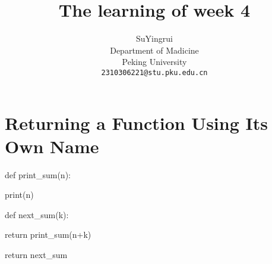 \documentclass{article}
\title{The learning of week 4}
\author{%
  SuYingrui \\
  Department of Madicine\\
  Peking University\\
  \texttt{2310306221@stu.pku.edu.cn} \\
}
\begin{document}
\maketitle

\section{Returning a Function Using Its Own Name}
def print\_sum(n):

print(n)
  
  def next\_sum(k):
      
      return print\_sum(n+k)
    
  return next\_sum
\end{document}
